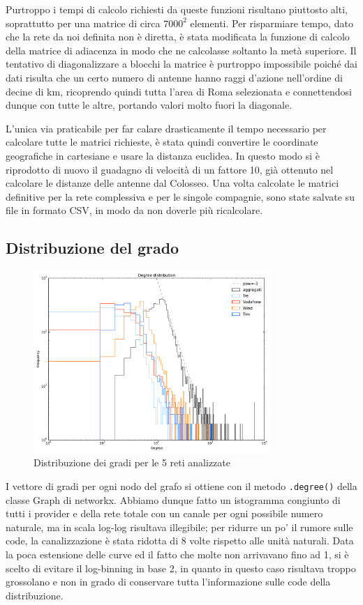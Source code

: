 Purtroppo i tempi di calcolo richiesti da queste funzioni risultano piuttosto alti, soprattutto per una matrice di circa $7000^2$ elementi. Per risparmiare tempo, dato che la rete da noi definita non è diretta, è stata modificata la funzione di calcolo della matrice di adiacenza in modo che ne calcolasse soltanto la metà superiore. Il tentativo di diagonalizzare a blocchi la matrice è purtroppo impossibile poiché dai dati risulta che un certo numero di antenne hanno raggi d'azione nell'ordine di decine di km, ricoprendo quindi tutta l'area di Roma selezionata e connettendosi dunque con tutte le altre, portando valori molto fuori la diagonale.

L'unica via praticabile per far calare drasticamente il tempo necessario per calcolare tutte le matrici richieste, è stata quindi convertire le coordinate geografiche in cartesiane e usare la distanza euclidea. In questo modo si è riprodotto di nuovo il guadagno di velocità di un fattore 10, già ottenuto nel calcolare le distanze delle antenne dal Colosseo. Una volta calcolate le matrici definitive per la rete complessiva e per le singole compagnie, sono state salvate su file in formato CSV, in modo da non doverle più ricalcolare.

\subsection{Distribuzione del grado}
\begin{figure}[b!]
	\centering
	\includegraphics[width=0.8\textwidth]{./Immagini/Dati/degreeDistribution}
	\caption{Distribuzione dei gradi per le 5 reti analizzate}
	\label{fig:gradi}
\end{figure}


I vettore di gradi per ogni nodo del grafo si ottiene con il metodo \lstinline{.degree()} della classe Graph di networkx. Abbiamo dunque fatto un istogramma congiunto di tutti i provider e della rete totale con un canale per ogni possibile numero naturale, ma in scala log-log risultava illegibile; per ridurre un po' il rumore sulle code, la canalizzazione è stata ridotta di 8 volte rispetto alle unità naturali. Data la poca estensione delle curve ed il fatto che molte non arrivavano fino ad 1, si è scelto di evitare il log-binning in base 2, in quanto in questo caso risultava troppo grossolano e non in grado di conservare tutta l'informazione sulle code della distribuzione.


